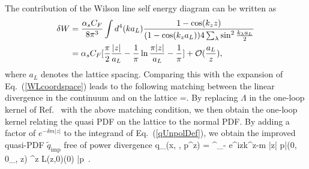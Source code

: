 The contribution of the Wilson line self energy diagram can be written as
\begin{align}
\delta W&=\frac{\alpha_s C_F}{8\pi^3}\int d^4(k a_L) \frac{1-\cos(k_z z)}{(1-\cos(k_z a_L))4\sum_\lambda \sin^2\frac{k_\lambda a_L}{2}}\nonumber\\
&=\alpha_s C_F[\frac{\pi}{2}\frac{|z|}{a_L}-\frac{1}{\pi}\ln\frac{\pi |z|}{a_L}-\frac{1}{\pi}]+\mathcal O(\frac{a_L}{z}),
\end{align}
where $a_L$ denotes the lattice spacing. Comparing this with the expansion of Eq.~(\ref{WLcoordspace}) leads to the following matching between the linear divergence in the continuum and on the lattice
\beq
\Lambda=.
\eeq
By replacing $\Lambda$ in the one-loop kernel of Ref.~\cite{Xiong:2013bka} with the above matching condition, we then obtain the one-loop kernel relating the quasi PDF on the lattice to the normal PDF. By adding a factor of $e^{-\delta m |z|}$ to the integrand of Eq.~(\ref{qUnpolDef}), we obtain the improved quasi-PDF $\tilde q_{\text{imp}}$ free of power divergence
\beq\label{im}
   \tilde q_{}(x, \Lambda, p^z) = \int^\infty_{-\infty}  e^{izk^z-\delta m |z|}  \langle p|\overline{\psi}(0, 0_\perp, z)
   \gamma^z L(z,0)\psi(0) |p\rangle \ .
\eeq

